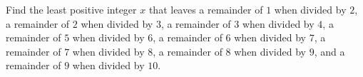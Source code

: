 Find the least positive integer $x$ that leaves a remainder of $1$ when divided by $2$, a remainder of $2$ when divided by $3$, a remainder of $3$ when divided by $4$, a remainder of $5$ when divided by $6$, a remainder of $6$ when divided by $7$, a remainder of $7$ when divided by $8$, a remainder of $8$ when divided by $9$, and a remainder of $9$ when divided by $10$.
